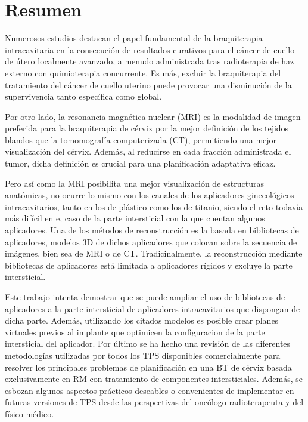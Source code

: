 \documentclass[
  a4paper,
]{scrreprt}
\begin{document}
\hypertarget{resumen}{%
\chapter*{Resumen}\label{resumen}}


Numerosos estudios destacan el papel fundamental de la braquiterapia
intracavitaria en la consecución de resultados curativos para el cáncer
de cuello de útero localmente avanzado, a menudo administrada tras
radioterapia de haz externo con quimioterapia concurrente. Es más,
excluir la braquiterapia del tratamiento del cáncer de cuello uterino
puede provocar una disminución de la supervivencia tanto específica como
global.

Por otro lado, la resonancia magnética nuclear (MRI) es la modalidad de
imagen preferida para la braquiterapia de cérvix por la mejor definición
de los tejidos blandos que la tomomografía computerizada (CT),
permitiendo una mejor visualización del cérvix. Además, al reducirse en
cada fracción administrada el tumor, dicha definición es crucial para
una planificación adaptativa eficaz.

Pero así como la MRI posibilita una mejor visualización de estructuras
anatómicas, no ocurre lo mismo con los canales de los aplicadores
ginecológicos intracavitarios, tanto en los de plástico como los de
titanio, siendo el reto todavía más difícil en e, caso de la parte
intersticial con la que cuentan algunos aplicadores. Una de los métodos
de reconstrucción es la basada en bibliotecas de aplicadores, modelos 3D
de dichos aplicadores que colocan sobre la secuencia de imágenes, bien
sea de MRI o de CT. Tradicinalmente, la reconstrucción mediante
bibliotecas de aplicadores está limitada a aplicadores rígidos y excluye
la parte intersticial.

Este trabajo intenta demostrar que se puede ampliar el uso de
bibliotecas de aplicadores a la parte intersticial de aplicadores
intracavitarios que dispongan de dicha parte. Además, utilizando los
citados modelos es posible crear planes virtuales previos al implante
que optimicen la configuracion de la parte intersticial del aplicador.
Por último se ha hecho una revisión de las diferentes metodologías
utilizadas por todos los TPS disponibles comercialmente para resolver
los principales problemas de planificación en una BT de cérvix basada
exclusivamente en RM con tratamiento de componentes intersticiales.
Además, se esbozan algunos aspectos prácticos deseables o convenientes
de implementar en futuras versiones de TPS desde las perspectivas del
oncólogo radioterapeuta y del físico médico.
\end{document}
